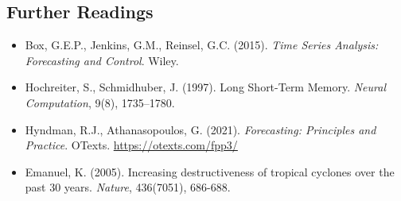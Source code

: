 \subsection{Further Readings}

\begin{itemize}
	\item Box, G.E.P., Jenkins, G.M., Reinsel, G.C. (2015). \textit{Time Series Analysis: Forecasting and Control}. Wiley. \cite{BoxEtAl2015}
	\item Hochreiter, S., Schmidhuber, J. (1997). Long Short-Term Memory. \textit{Neural Computation}, 9(8), 1735–1780. \cite{HochreiterSchmidhuber1997}
	\item Hyndman, R.J., Athanasopoulos, G. (2021). \textit{Forecasting: Principles and Practice}. OTexts. \url{https://otexts.com/fpp3/}
	\item Emanuel, K. (2005). Increasing destructiveness of tropical cyclones over the past 30 years. \textit{Nature}, 436(7051), 686-688. \cite{Emanuel2005}
\end{itemize}